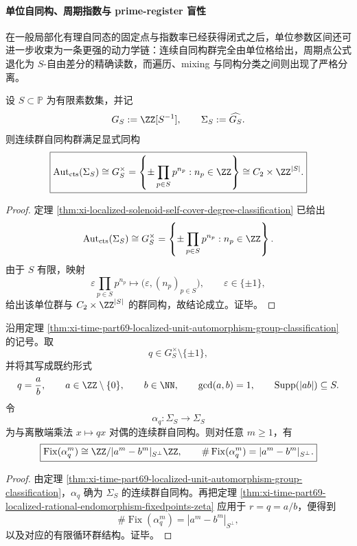 \paragraph{单位自同构、周期指数与 prime-register 盲性}
在一般局部化有理自同态的固定点与指数率已经获得闭式之后，单位参数区间还可进一步收束为一条更强的动力学链：连续自同构群完全由单位格给出，周期点公式退化为 \(S\)-自由差分的精确读数，而遍历、mixing 与同构分类之间则出现了严格分离。

\begin{theorem}\label{thm:xi-time-part69-localized-unit-automorphism-group-classification}
设 \(S\subset\mathbb P\) 为有限素数集，并记
\[
G_S:=\ZZ[S^{-1}],
\qquad
\Sigma_S:=\widehat{G_S}.
\]
则连续群自同构群满足显式同构
\[
\boxed{
\operatorname{Aut}_{\mathrm{cts}}(\Sigma_S)
\cong
G_S^\times
=
\left\{\pm\prod_{p\in S}p^{n_p}:n_p\in\ZZ\right\}
\cong
C_2\times \ZZ^{|S|}.
}
\]
\end{theorem}
\begin{proof}
定理 \ref{thm:xi-localized-solenoid-self-cover-degree-classification} 已给出
\[
\operatorname{Aut}_{\mathrm{cts}}(\Sigma_S)\cong G_S^\times
=
\left\{\pm\prod_{p\in S}p^{n_p}:n_p\in\ZZ\right\}.
\]
由于 \(S\) 有限，映射
\[
\varepsilon\prod_{p\in S}p^{n_p}
\longmapsto
\bigl(\varepsilon,(n_p)_{p\in S}\bigr),
\qquad
\varepsilon\in\{\pm1\},
\]
给出该单位群与 \(C_2\times \ZZ^{|S|}\) 的群同构，故结论成立。证毕。
\end{proof}

\begin{theorem}[单位比值自同构的周期点公式]\label{thm:xi-time-part69-unit-automorphism-periodic-point-formula}
沿用定理 \ref{thm:xi-time-part69-localized-unit-automorphism-group-classification} 的记号。取
\[
q\in G_S^\times\setminus\{\pm1\},
\]
并将其写成既约形式
\[
q=\frac{a}{b},
\qquad
a\in\ZZ\setminus\{0\},
\qquad
b\in\NN,
\qquad
\gcd(a,b)=1,
\qquad
\operatorname{Supp}(|ab|)\subseteq S.
\]
令
\[
\alpha_q:\Sigma_S\to\Sigma_S
\]
为与离散端乘法 \(x\mapsto qx\) 对偶的连续群自同构。则对任意 \(m\ge 1\)，有
\[
\boxed{
\operatorname{Fix}(\alpha_q^m)
\cong
\ZZ/|a^m-b^m|_{S^\perp}\ZZ,
\qquad
\#\operatorname{Fix}(\alpha_q^m)=|a^m-b^m|_{S^\perp}.
}
\]
\end{theorem}
\begin{proof}
由定理 \ref{thm:xi-time-part69-localized-unit-automorphism-group-classification}，\(\alpha_q\) 确为 \(\Sigma_S\) 的连续群自同构。再把定理 \ref{thm:xi-time-part69-localized-rational-endomorphism-fixedpoints-zeta} 应用于 \(r=q=a/b\)，便得到
\[
\#\operatorname{Fix}(\alpha_q^m)=|a^m-b^m|_{S^\perp},
\]
以及对应的有限循环群结构。证毕。
\end{proof}

